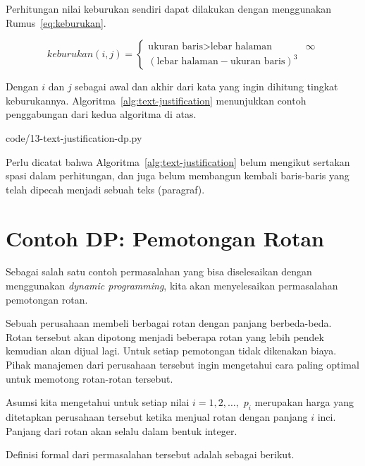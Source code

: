 Perhitungan nilai keburukan sendiri dapat dilakukan dengan menggunakan Rumus~\ref{eq:keburukan}.

\begin{equation}\label{eq:keburukan}
    keburukan(i, j) = 
        \begin{cases}
            \text{ukuran baris} > \text{lebar halaman} & \infty \\
            (\text{lebar halaman} - \text{ukuran baris})^3
        \end{cases}
\end{equation}

Dengan $i$ dan $j$ sebagai awal dan akhir dari kata yang ingin dihitung tingkat keburukannya. Algoritma~\ref{alg:text-justification} menunjukkan contoh penggabungan dari kedua algoritma di atas.


                {code/13-text-justification-dp.py}

Perlu dicatat bahwa Algoritma~\ref{alg:text-justification} belum mengikut sertakan spasi dalam perhitungan, dan juga belum membangun kembali baris-baris yang telah dipecah menjadi sebuah teks (paragraf).

\section{Contoh DP: Pemotongan Rotan}
Sebagai salah satu contoh permasalahan yang bisa diselesaikan dengan menggunakan \textit{dynamic programming}, kita akan menyelesaikan permasalahan pemotongan rotan. 

Sebuah perusahaan membeli berbagai rotan dengan panjang berbeda-beda. Rotan tersebut akan dipotong menjadi beberapa rotan yang lebih pendek kemudian akan dijual lagi. Untuk setiap pemotongan tidak dikenakan biaya. Pihak manajemen dari perusahaan tersebut ingin mengetahui cara paling optimal untuk memotong rotan-rotan tersebut.

Asumsi kita mengetahui untuk setiap nilai $i=1,2,\ldots,$ $p_i$ merupakan harga yang ditetapkan perusahaan tersebut ketika menjual rotan dengan panjang $i$ inci. Panjang dari rotan akan selalu dalam bentuk integer. 

Definisi formal dari permasalahan tersebut adalah sebagai berikut.

